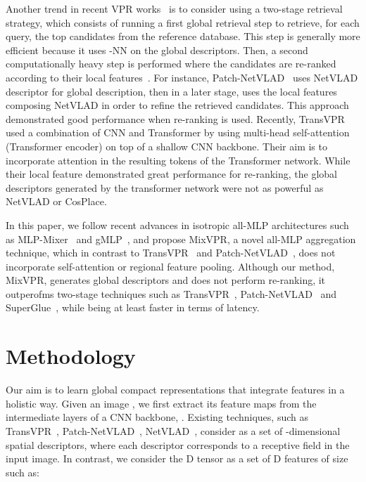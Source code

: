 \documentclass[10pt,twocolumn,letterpaper]{article}
\begin{document}
Another trend in recent VPR works~\cite{hausler2021patch, wang2022transvpr} is to consider using a two-stage retrieval strategy, which consists of running a first global retrieval step to retrieve, for each query, the top  candidates from the reference database. This step is generally more efficient because it uses -NN on the global descriptors. Then, a second computationally heavy step is performed where the candidates are re-ranked according to their local features~\cite{taira2018inloc, sarlin2019coarse, sarlin2020superglue}. For instance, Patch-NetVLAD~\cite{hausler2021patch} uses NetVLAD descriptor for global description, then in a later stage, uses the local features composing NetVLAD in order to refine the retrieved candidates. This approach demonstrated good performance when re-ranking is used. Recently, TransVPR~\cite{wang2022transvpr} used a combination of CNN and Transformer by using multi-head self-attention (Transformer encoder) on top of a shallow CNN backbone. Their aim is to incorporate attention in the resulting tokens of the Transformer network. While their local feature demonstrated great performance for re-ranking, the global descriptors generated by the transformer network were not as powerful as NetVLAD or CosPlace.

In this paper, we follow recent advances in isotropic all-MLP architectures such as MLP-Mixer~\cite{tolstikhin2021mlp} and gMLP~\cite{liu2021pay}, and propose MixVPR, a novel all-MLP aggregation technique, which in contrast to TransVPR~\cite{wang2022transvpr} and Patch-NetVLAD~\cite{hausler2021patch}, does not incorporate self-attention or regional feature pooling. Although our method, MixVPR, generates global descriptors and does not perform re-ranking, it outperofms two-stage techniques such as TransVPR~\cite{wang2022transvpr}, Patch-NetVLAD~\cite{hausler2021patch} and SuperGlue~\cite{sarlin2020superglue}, while being at least  faster in terms of latency.




\section{Methodology}
\label{sec:metho}
Our aim is to learn global compact representations that integrate features in a holistic way. Given an image , we first extract its feature maps  from the intermediate layers of a CNN backbone, . Existing techniques, such as TransVPR~\cite{wang2022transvpr}, Patch-NetVLAD~\cite{hausler2021patch}, NetVLAD~\cite{arandjelovic2016netvlad}, consider  as a set of -dimensional spatial descriptors, where each descriptor corresponds to a receptive field in the input image. 
In contrast, we consider the D tensor  as a set of D features of size  such as:
\end{document}
